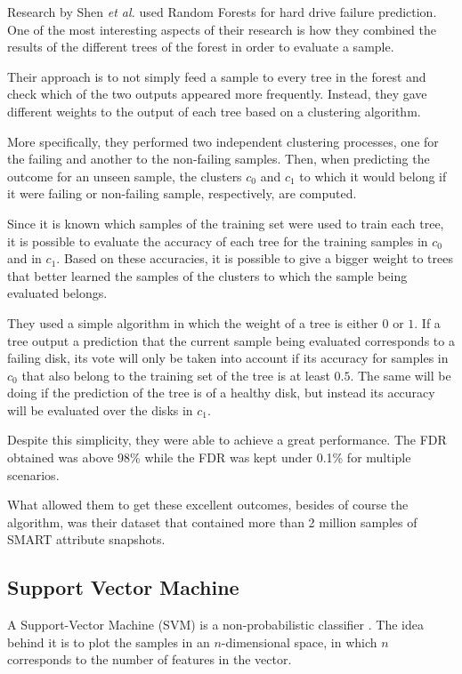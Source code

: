 Research by Shen \textit{et al.} \cite{Shen18} used Random Forests for hard drive failure prediction.
One of the most interesting aspects of their research is how they combined the results of the different trees of the forest in order to evaluate a sample.

Their approach is to not simply feed a sample to every tree in the forest and check which of the two outputs appeared more frequently.
Instead, they gave different weights to the output of each tree based on a clustering algorithm.

More specifically, they performed two independent clustering processes, one for the failing and another to the non-failing samples.
Then, when predicting the outcome for an unseen sample, the clusters $c_0$ and $c_1$ to which it would belong if it were failing or non-failing sample, respectively, are computed.

Since it is known which samples of the training set were used to train each tree, it is possible to evaluate the accuracy of each tree for the training samples in $c_0$ and in $c_1$.
Based on these accuracies, it is possible to give a bigger weight to trees that better learned the samples of the clusters to which the sample being evaluated belongs.

They used a simple algorithm in which the weight of a tree is either $0$ or $1$.
If a tree output a prediction that the current sample being evaluated corresponds to a failing disk, its vote will only be taken into account if its accuracy for samples in $c_0$ that also belong to the training set of the tree is at least $0.5$.
The same will be doing if the prediction of the tree is of a healthy disk, but instead its accuracy will be evaluated over the disks in $c_1$.

Despite this simplicity, they were able to achieve a great performance.
The FDR obtained was above 98\% while the FDR was kept under 0.1\% for multiple scenarios.

What allowed them to get these excellent outcomes, besides of course the algorithm, was their dataset that contained more than 2 million samples of SMART attribute snapshots.

\subsection{Support Vector Machine}

A Support-Vector Machine (SVM) is a non-probabilistic classifier \cite{cortes1995support}.
The idea behind it is to plot the samples in an $n$-dimensional space, in which $n$ corresponds to the number of features in the vector.

